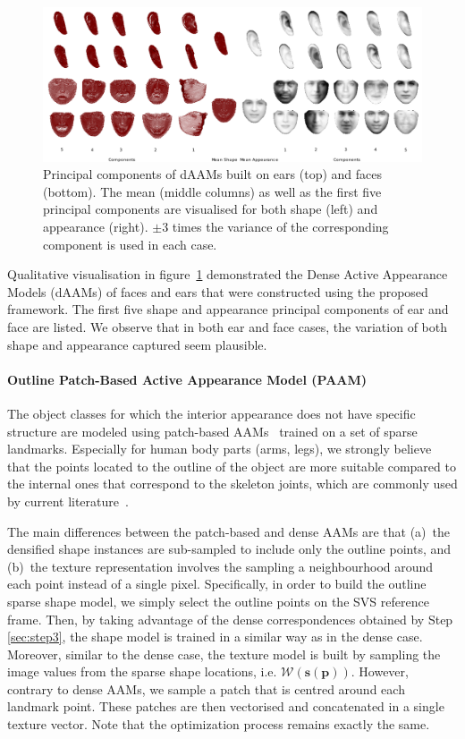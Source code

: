 \begin{figure}
    \centering
    \includegraphics[width=\textwidth]{resources/Annotation_Correction/Suplementory_Meterial/Models/models}
    \caption{Principal components of dAAMs built on ears (top) and faces (bottom). The mean (middle columns) as well as the first five principal components are visualised for both shape (left) and appearance (right). $\pm 3$ times the variance of the corresponding component is used in each case.}
    \label{fig:pcamodel}
\end{figure}

Qualitative visualisation in figure~\ref{fig:pcamodel} demonstrated the Dense Active Appearance Models (dAAMs) of faces and ears that were constructed using the proposed framework. The first five shape and appearance principal components of ear and face are listed. We observe that in both ear and face cases, the variation of both shape and appearance captured seem plausible.

\paragraph{Outline Patch-Based Active Appearance Model (PAAM)} The object classes for which the interior appearance does not have specific structure are modeled using patch-based AAMs~\cite{Tzimiropoulos2014} trained on a set of sparse landmarks. Especially for human body parts (arms, legs), we strongly believe that the points located to the outline of the object are more suitable compared to the internal ones that correspond to the skeleton joints, which are commonly used by current literature~\cite{buehler2011upper,charles2013domain,pfister2015flowing,yang2013articulated}.

The main differences between the patch-based and dense AAMs are that (a)~the densified shape instances are sub-sampled to include only the outline points, and (b)~the texture representation involves the sampling a neighbourhood around each point instead of a single pixel. Specifically, in order to build the outline sparse shape model, we simply select the outline points on the SVS reference frame. Then, by taking advantage of the dense correspondences obtained by Step \ref{sec:step3}, the shape model is trained in a similar way as in the dense case. Moreover, similar to the dense case, the texture model is built by sampling the image values from the sparse shape locations, i.e. $\mathcal{W}(\bm{s}(\bm{p}))$. However, contrary to dense AAMs, we sample a patch that is centred around each landmark point. These patches are then vectorised and concatenated in a single texture vector. Note that the optimization process remains exactly the same.

